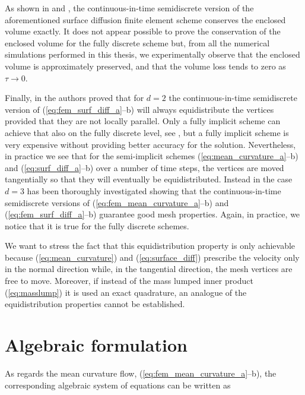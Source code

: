 As shown in \cite[Remark~2.3]{triplej} and \cite[\S~4]{gflows3d}, the
continuous-in-time semidiscrete version of the aforementioned surface
diffusion finite element scheme conserves the enclosed volume exactly. It does
not appear possible to prove the conservation of the enclosed volume for the
fully discrete scheme but, from all the numerical simulations performed in this
thesis, we experimentally observe that the enclosed volume is approximately
preserved, and that the volume loss tends to zero as $\tau \to 0$.

Finally, in \cite[Remark~2.4]{triplej} the authors proved that for $d=2$ the
continuous-in-time semidiscrete version of (\ref{eq:fem_surf_diff_a}--b)
will always equidistribute the vertices provided that they are not locally
parallel. Only a fully implicit scheme can achieve that also on the fully
discrete level, see \cite{fdfi}, but a fully implicit scheme is very
expensive without providing better accuracy for the solution. Nevertheless, in
practice we see that for the semi-implicit schemes
(\ref{eq:mean_curvature_a}--b) and (\ref{eq:surf_diff_a}--b) over a number of
time steps, the vertices are moved tangentially so that they will eventually be
equidistributed. Instead in \cite[\S~4]{gflows3d} the case $d=3$ has been
thoroughly investigated showing that the continuous-in-time semidiscrete
versions of (\ref{eq:fem_mean_curvature_a}--b) and
(\ref{eq:fem_surf_diff_a}--b) guarantee good mesh properties. Again, in
practice, we notice that it is true for the fully discrete schemes.

We want to stress the fact that this equidistribution property is only
achievable because (\ref{eq:mean_curvature}) and (\ref{eq:surface_diff})
prescribe the velocity only in the normal direction while, in the tangential
direction, the mesh vertices are free to move. Moreover, if instead of the mass
lumped inner product (\ref{eq:masslump}) it is used an exact quadrature, an
analogue of the equidistribution properties cannot be established.

\section{Algebraic formulation}\label{sec:geometric_pdes_algebraic}
As regards the mean curvature flow, (\ref{eq:fem_mean_curvature_a}--b), the
corresponding algebraic system of equations can be written as


